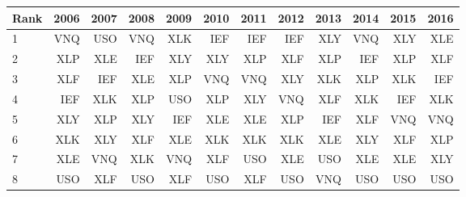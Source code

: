 \begin{tabular}{lrrrrrrrrrrr}
\toprule
Rank & 2006 & 2007 & 2008 & 2009 & 2010 & 2011 & 2012 & 2013 & 2014 & 2015 & 2016 \\
\midrule
1 & VNQ & USO & VNQ & XLK & IEF & IEF & IEF & XLY & VNQ & XLY & XLE \\
2 & XLP & XLE & IEF & XLY & XLY & XLP & XLF & XLP & IEF & XLP & XLF \\
3 & XLF & IEF & XLE & XLP & VNQ & VNQ & XLY & XLK & XLP & XLK & IEF \\
4 & IEF & XLK & XLP & USO & XLP & XLY & VNQ & XLF & XLK & IEF & XLK \\
5 & XLY & XLP & XLY & IEF & XLE & XLE & XLP & IEF & XLF & VNQ & VNQ \\
6 & XLK & XLY & XLF & XLE & XLK & XLK & XLK & XLE & XLY & XLF & XLP \\
7 & XLE & VNQ & XLK & VNQ & XLF & USO & XLE & USO & XLE & XLE & XLY \\
8 & USO & XLF & USO & XLF & USO & XLF & USO & VNQ & USO & USO & USO \\
\bottomrule
\end{tabular}
